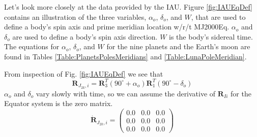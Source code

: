 {Let's look more closely at the data provided by the IAU. Figure
\ref{fig:IAUEqDef} contains an illustration of the three variables,
$\alpha_o$, $\delta_o$, and $W$, that are used to define a body's
spin axis and prime meridian location w/r/t MJ2000Eq. $\alpha_o$ and
$\delta_o$ are used to define a body's spin axis direction. $W$ is
the body's sidereal time.  The equations for $\alpha_o$, $\delta_o$,
and $W$ for the nine planets and the Earth's moon are found in
Tables \ref{Table:PlanetsPolesMeridians} and
\ref{Table:LunaPoleMeridian}.
%
%
From inspection of Fig. \ref{fig:IAUEqDef} we see that
%
\begin{equation}
     \mathbf{R}_{J_{2k},i} = \mathbf{R}_3^{T}(90^{\circ} + \alpha_o)
     \mathbf{R}_1^{T}(90^{\circ}- \delta_o) \label{Eq:EquatorR}
\end{equation}
%
$\alpha_o$ and $\delta_o$ vary slowly with time, so we can assume
the derivative of $\mathbf{R}_{Ii}$ for the Equator system is the
zero matrix.
%
\begin{equation}
  \dot{\mathbf{R}}_{J_{2k},i} =   \begin{pmatrix}
     0.0 & 0.0 & 0.0\\
     0.0 & 0.0 & 0.0\\
     0.0 & 0.0 & 0.0
     \end{pmatrix}
\end{equation}

}
